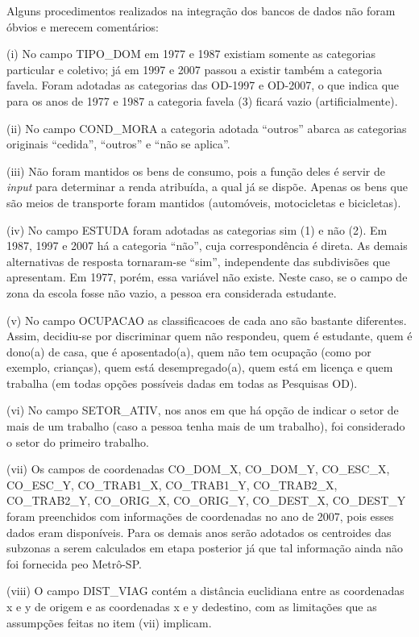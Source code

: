 Alguns procedimentos realizados na integração dos bancos de dados não foram óbvios e merecem comentários:
\begin{compactitem}[]
\item(i) No campo TIPO_DOM em 1977 e 1987 existiam somente as categorias particular e coletivo; já em 1997 e 2007 passou a existir também a categoria favela. Foram adotadas as categorias das OD-1997 e OD-2007, o que indica que para os anos de 1977 e 1987 a categoria favela (3) ficará vazio (artificialmente).
\item(ii) No campo COND_MORA a categoria adotada ``outros'' abarca as categorias originais ``cedida'', ``outros'' e ``não se aplica''.
\item(iii) Não foram mantidos os bens de consumo, pois a função deles é servir de \emph{input} para determinar a renda atribuída, a qual já se dispõe. Apenas os bens que são meios de transporte foram mantidos (automóveis, motocicletas e bicicletas).
\item (iv) No campo ESTUDA foram adotadas as categorias sim (1) e não (2). Em 1987, 1997 e 2007 há a categoria ``não'', cuja correspondência é direta. As demais alternativas de resposta tornaram-se ``sim'', independente das subdivisões que apresentam. Em 1977, porém, essa variável não existe. Neste caso, se o campo de zona da escola fosse não vazio, a pessoa era considerada estudante.
\item (v) No campo OCUPACAO as classificacoes de cada ano são bastante diferentes. Assim, decidiu-se por discriminar quem não respondeu, quem é estudante, quem é dono(a) de casa, que é aposentado(a), quem não tem ocupação (como por exemplo, crianças), quem está desempregado(a), quem está em licença e quem trabalha (em todas opções possíveis dadas em todas as Pesquisas OD).
\item(vi) No campo SETOR_ATIV, nos anos em que há opção de indicar o setor de mais de um trabalho (caso a pessoa tenha mais de um trabalho), foi considerado o setor do primeiro trabalho.
\item(vii) Os campos de coordenadas CO_DOM_X, CO_DOM_Y, CO_ESC_X, CO_ESC_Y, CO_TRAB1_X, CO_TRAB1_Y, CO_TRAB2_X, CO_TRAB2_Y, CO_ORIG_X, CO_ORIG_Y, CO_DEST_X, CO_DEST_Y foram preenchidos com informações de coordenadas no ano de 2007, pois esses dados eram disponíveis. Para os demais anos serão adotados os centroides das subzonas a serem calculados em etapa posterior já que tal informação ainda não foi fornecida peo Metrô-SP.
\item(viii) O campo DIST_VIAG contém a distância euclidiana entre as coordenadas x e y de origem e as coordenadas x e y dedestino, com as limitações que as assumpções feitas no item (vii) implicam.

\end{compactitem}
